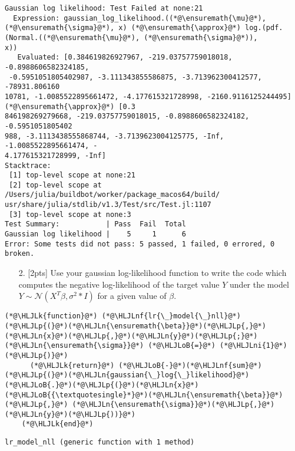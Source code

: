 \documentclass[12pt,a4paper]{article}
\newcommand{\HLJLk}[1]{\textcolor[RGB]{148,91,176}{\textbf{#1}}}
\newcommand{\HLJLn}[1]{#1}
\newcommand{\HLJLnf}[1]{\textcolor[RGB]{66,102,213}{#1}}
\newcommand{\HLJLni}[1]{\textcolor[RGB]{59,151,46}{#1}}
\newcommand{\HLJLoB}[1]{\textcolor[RGB]{102,102,102}{\textbf{#1}}}
\newcommand{\HLJLp}[1]{#1}
\begin{document}
\begin{lstlisting}
Gaussian log likelihood: Test Failed at none:21
  Expression: gaussian_log_likelihood.((*@\ensuremath{\mu}@*), (*@\ensuremath{\sigma}@*), x) (*@\ensuremath{\approx}@*) log.(pdf.(Normal.((*@\ensuremath{\mu}@*), (*@\ensuremath{\sigma}@*)), 
x))
   Evaluated: [0.384619826927967, -219.03757759018018, -0.8988606582324185,
 -0.5951051805402987, -3.111343855586875, -3.713962300412577, -78931.806160
10781, -1.0085522895661472, -4.177615321728998, -2160.9116125244495] (*@\ensuremath{\approx}@*) [0.3
846198269279668, -219.03757759018015, -0.8988606582324182, -0.5951051805402
988, -3.1113438555868744, -3.7139623004125775, -Inf, -1.0085522895661474, -
4.177615321728999, -Inf]
Stacktrace:
 [1] top-level scope at none:21
 [2] top-level scope at /Users/julia/buildbot/worker/package_macos64/build/
usr/share/julia/stdlib/v1.3/Test/src/Test.jl:1107
 [3] top-level scope at none:3
Test Summary:           | Pass  Fail  Total
Gaussian log likelihood |    5     1      6
Error: Some tests did not pass: 5 passed, 1 failed, 0 errored, 0 broken.
\end{lstlisting}


\begin{itemize}
\item[2. ] [2pts] Use your gaussian log-likelihood function to write the code which computes the negative log-likelihood of the target value $Y$ under the model $Y \sim \mathcal{N}(X^T\beta, \sigma^2*I)$ for  a given value of $\beta$.

\end{itemize}

\begin{lstlisting}
(*@\HLJLk{function}@*) (*@\HLJLnf{lr{\_}model{\_}nll}@*)(*@\HLJLp{(}@*)(*@\HLJLn{\ensuremath{\beta}}@*)(*@\HLJLp{,}@*)(*@\HLJLn{x}@*)(*@\HLJLp{,}@*)(*@\HLJLn{y}@*)(*@\HLJLp{;}@*)(*@\HLJLn{\ensuremath{\sigma}}@*) (*@\HLJLoB{=}@*) (*@\HLJLni{1}@*)(*@\HLJLp{)}@*)
      (*@\HLJLk{return}@*) (*@\HLJLoB{-}@*)(*@\HLJLnf{sum}@*)(*@\HLJLp{(}@*)(*@\HLJLn{gaussian{\_}log{\_}likelihood}@*)(*@\HLJLoB{.}@*)(*@\HLJLp{(}@*)(*@\HLJLn{x}@*)(*@\HLJLoB{{\textquotesingle}*}@*)(*@\HLJLn{\ensuremath{\beta}}@*)(*@\HLJLp{,}@*) (*@\HLJLn{\ensuremath{\sigma}}@*)(*@\HLJLp{,}@*) (*@\HLJLn{y}@*)(*@\HLJLp{))}@*)
    (*@\HLJLk{end}@*)
\end{lstlisting}

\begin{lstlisting}
lr_model_nll (generic function with 1 method)
\end{lstlisting}
\end{document}
